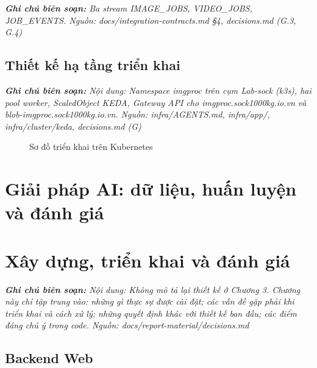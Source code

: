 \documentclass[a4paper,12pt]{article}
\begin{document}
{\small\itshape\noindent\textbf{Ghi chú biên soạn:} Ba stream IMAGE\_JOBS, VIDEO\_JOBS, JOB\_EVENTS.  Nguồn: docs/integration-contracts.md §4, decisions.md (G.3, G.4)\par\vspace{6pt}}





\subsection{Thiết kế hạ tầng triển khai}

{\small\itshape\noindent\textbf{Ghi chú biên soạn:} Nội dung: Namespace imgproc trên cụm Lab-sock (k3s), hai pool worker, ScaledObject KEDA, Gateway API cho imgproc.sock1000kg.io.vn và blob-imgproc.sock1000kg.io.vn.  Nguồn: infra/AGENTS.md, infra/app/, infra/cluster/keda, decisions.md (G)\par\vspace{6pt}}


\begin{figure}[htbp]
\centering
{}
\caption{Sơ đồ triển khai trên Kubernetes}
\label{fig:3-12}
\end{figure}


\clearpage
\section{Giải pháp AI: dữ liệu, huấn luyện và đánh giá}
\label{sec:ch4}




\clearpage
\section{Xây dựng, triển khai và đánh giá}
\label{sec:ch5}

{\small\itshape\noindent\textbf{Ghi chú biên soạn:} Nội dung: Không mô tả lại thiết kế ở Chương 3. Chương này chỉ tập trung vào: những gì thực sự được cài đặt; các vấn đề gặp phải khi triển khai và cách xử lý; những quyết định khác với thiết kế ban đầu; các điểm đáng chú ý trong code.  Nguồn: docs/report-material/decisions.md\par\vspace{6pt}}


\subsection{Backend Web}
\end{document}
